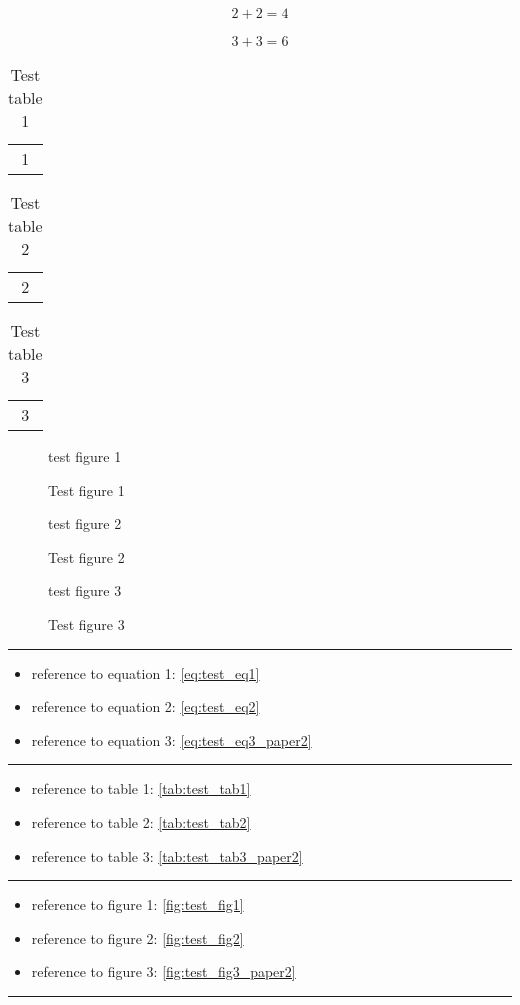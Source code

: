 \begin{align}
	2 + 2 = 4
	\label{eq:test_eq2}
\end{align}

\begin{equation}
	3 + 3 = 6
	\label{eq:test_eq3_paper2}
\end{equation}

%
\begin{table}
	\centering
	\begin{tabular}{c}
		1
	\end{tabular}
	\caption{Test table 1}
	\label{tab:test_tab1}
\end{table}

\begin{table}
	\centering
	\begin{tabular}{c}
		2
	\end{tabular}
	\caption{Test table 2}
	\label{tab:test_tab2}
\end{table}

\begin{table}
	\centering
	\begin{tabular}{c}
		3
	\end{tabular}
	\caption{Test table 3}
	\label{tab:test_tab3_paper2}
\end{table}

%
\begin{figure}[h!]
	\centering
	test figure 1
	\caption{Test figure 1}
	\label{fig:test_fig1}
\end{figure}

\begin{figure}[h!]
	\centering
	test figure 2
	\caption{Test figure 2}
	\label{fig:test_fig2}
\end{figure}

\begin{figure}[h!]
	\centering
	test figure 3
	\caption{Test figure 3}
	\label{fig:test_fig3_paper2}
\end{figure}

%
\hrule
\begin{itemize}
	\item reference to equation 1: \eqref{eq:test_eq1}
	\item reference to equation 2: \eqref{eq:test_eq2}
	\item reference to equation 3: \eqref{eq:test_eq3_paper2}
\end{itemize}
\hrule
\begin{itemize}
	\item reference to table 1: \eqref{tab:test_tab1}
	\item reference to table 2: \eqref{tab:test_tab2}
	\item reference to table 3: \eqref{tab:test_tab3_paper2}
\end{itemize}
\hrule
\begin{itemize}
	\item reference to figure 1: \eqref{fig:test_fig1}
	\item reference to figure 2: \eqref{fig:test_fig2}
	\item reference to figure 3: \eqref{fig:test_fig3_paper2}
\end{itemize}
\hrule

